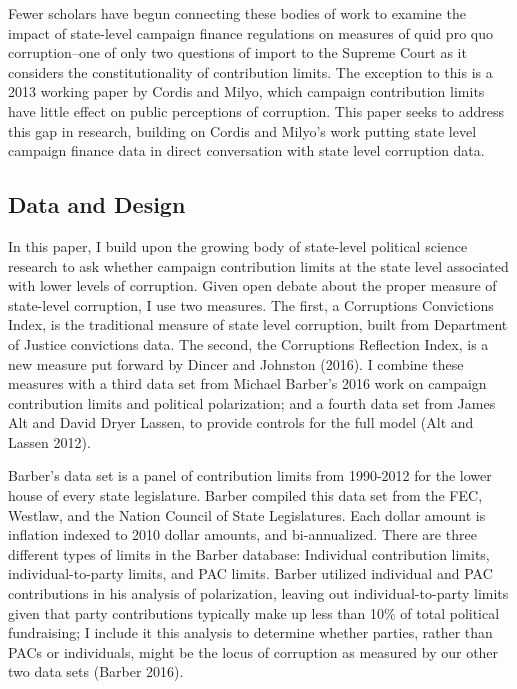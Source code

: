\documentclass{jopsubmission}
\begin{document}
Fewer scholars have begun connecting these bodies of work to examine the
impact of state-level campaign finance regulations on measures of quid
pro quo corruption--one of only two questions of import to the Supreme
Court as it considers the constitutionality of contribution limits. The
exception to this is a 2013 working paper by Cordis and Milyo, which
campaign contribution limits have little effect on public perceptions of
corruption. This paper seeks to address this gap in research, building
on Cordis and Milyo's work putting state level campaign finance data in
direct conversation with state level corruption data.

\subsection{Data and Design}\label{data-and-design}

In this paper, I build upon the growing body of state-level political
science research to ask whether campaign contribution limits at the
state level associated with lower levels of corruption. Given open
debate about the proper measure of state-level corruption, I use two
measures. The first, a Corruptions Convictions Index, is the traditional
measure of state level corruption, built from Department of Justice
convictions data. The second, the Corruptions Reflection Index, is a new
measure put forward by Dincer and Johnston (2016). I combine these
measures with a third data set from Michael Barber's 2016 work on
campaign contribution limits and political polarization; and a fourth
data set from James Alt and David Dryer Lassen, to provide controls for
the full model (Alt and Lassen 2012).

Barber's data set is a panel of contribution limits from 1990-2012 for
the lower house of every state legislature. Barber compiled this data
set from the FEC, Westlaw, and the Nation Council of State Legislatures.
Each dollar amount is inflation indexed to 2010 dollar amounts, and
bi-annualized. There are three different types of limits in the Barber
database: Individual contribution limits, individual-to-party limits,
and PAC limits. Barber utilized individual and PAC contributions in his
analysis of polarization, leaving out individual-to-party limits given
that party contributions typically make up less than 10\% of total
political fundraising; I include it this analysis to determine whether
parties, rather than PACs or individuals, might be the locus of
corruption as measured by our other two data sets (Barber 2016).
\end{document}
